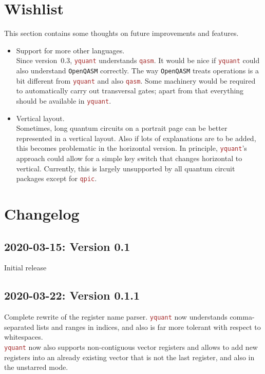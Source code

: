 \documentclass{scrartcl}
\makeatletter
\def\pkg#1{\textcolor{brown}{\texttt{#1}}}
\def\Yquant{\pkg{yquant}}
\newcommand*{\the@orig@section}{}
\let\the@orig@section=\section
\renewcommand*{\section}{%
   \clearpage%
   \the@orig@section%
}
\makeatother
\begin{document}
   \section{Wishlist}
      This section contains some thoughts on future improvements and features.
      \begin{itemize}
         \item Support for more other languages. \\
            Since version~0.3, \Yquant{} understands \pkg{qasm}.
            It would be nice if \Yquant{} could also understand \texttt{OpenQASM} correctly.
            The way \texttt{OpenQASM} treats operations is a bit different from \Yquant{} and also \pkg{qasm}.
            Some machinery would be required to automatically carry out transversal gates; apart from that everything should be available in \Yquant.
         \item Vertical layout. \\
            Sometimes, long quantum circuits on a portrait page can be better represented in a vertical layout.
            Also if lots of explanations are to be added, this becomes problematic in the horizontal version.
            In principle, \Yquant's approach could allow for a simple key switch that changes horizontal to vertical.
            Currently, this is largely unsupported by all quantum circuit packages except for \pkg{qpic}.
      \end{itemize}

   \section{Changelog}
      \subsection*{2020-03-15: Version 0.1}
         Initial release

      \subsection*{2020-03-22: Version 0.1.1}
         Complete rewrite of the register name parser.
         \Yquant{} now understands comma\hyp separated lists and ranges in indices, and also is far more tolerant with respect to whitespaces. \\
         \Yquant{} now also supports non\hyp contiguous vector registers and allows to add new registers into an already existing vector that is not the last register, and also in the unstarred mode.
\end{document}
